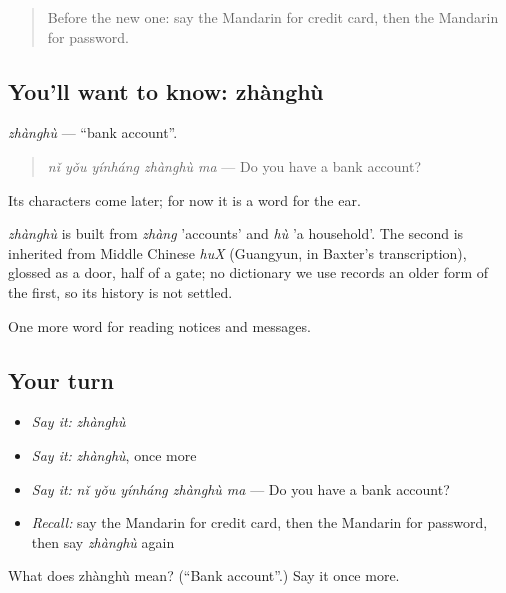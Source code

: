 \label{lesson:ZH-C195-zhanghu}



\begin{quote}
Before the new one: say the Mandarin for credit card, then the Mandarin for password.
\end{quote}

\subsection*{You'll want to know: zhànghù}
\emph{zhànghù} — \textquotedblleft{}bank account\textquotedblright{}.

\begin{quote}
\emph{nǐ yǒu yínháng zhànghù ma} — Do you have a bank account?
\end{quote}

Its characters come later; for now it is a word for the ear.

\begin{cousinweb}
\emph{zhànghù} is built from \emph{zhàng} 'accounts' and \emph{hù} 'a household'. The second is inherited from Middle Chinese \emph{huX} (Guangyun, in Baxter's transcription), glossed as a door, half of a gate; no dictionary we use records an older form of the first, so its history is not settled.
\end{cousinweb}

\begin{grammarlens}[title={What you've built}]
One more word for reading notices and messages.
\end{grammarlens}

\subsection*{Your turn}
\begin{itemize}
\raggedright
  \item \emph{Say it:} \emph{zhànghù}
  \item \emph{Say it:} \emph{zhànghù}, once more
  \item \emph{Say it:} \emph{nǐ yǒu yínháng zhànghù ma} — Do you have a bank account?
  \item \emph{Recall:} say the Mandarin for credit card, then the Mandarin for password, then say \emph{zhànghù} again
\end{itemize}

\begin{tcolorbox}[breakable,colback=teal!4,colframe=teal!35!black,title={Before you move on}]
What does zhànghù mean? (\textquotedblleft{}Bank account\textquotedblright{}.) Say it once more.
\end{tcolorbox}
